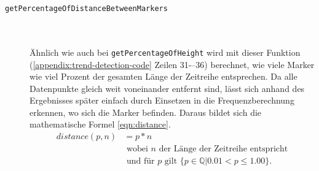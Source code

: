 \begin{description}
\item[\texttt{getPercentageOfDistanceBetweenMarkers}] \hfill \\\\
Ähnlich wie auch bei \texttt{getPercentageOfHeight} wird mit dieser Funktion (\ref{appendix:trend-detection-code} Zeilen 31-–36) berechnet, wie viele Marker wie viel Prozent der gesamten Länge der Zeitreihe entsprechen. Da alle Datenpunkte gleich weit voneinander entfernt sind, lässt sich anhand des Ergebnisses später einfach durch Einsetzen in die Frequenzberechnung erkennen, wo sich die Marker befinden. Daraus bildet sich die mathematische Formel \ref{eqn:distance}.\\
\begin{equation}
\begin{split}
\label{eqn:distance}
    distance(p,n)&= p * n\\ 
    &\text{ wobei }n\text{ der Länge der Zeitreihe entspricht}\\ &\text{ und für }p\text{ gilt }\{p \in \mathbb{Q}| 0.01 < p \le 1.00 \}.\\\
\end{split}
\end{equation}


\end{description}
